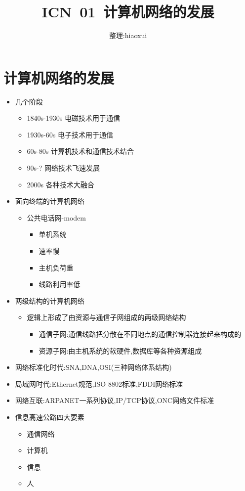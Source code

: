 \documentclass[a4paper,12pt,notitlepage]{article}
\begin{document}
\title{ICN\ 01\ 计算机网络的发展}
\author{整理:hiaoxui}
\maketitle

\section{计算机网络的发展} 

\begin{itemize}
	\item 几个阶段
	\begin{itemize}
		\item 1840s-1930s 电磁技术用于通信
		\item 1930s-60s 电子技术用于通信
		\item 60s-80s 计算机技术和通信技术结合
		\item 90s-? 网络技术飞速发展
		\item 2000s 各种技术大融合
	\end{itemize}
	\item 面向终端的计算机网络
	\begin{itemize}
		\item 公共电话网-modem
		\begin{itemize}
			\item 单机系统
			\item 速率慢
			\item 主机负荷重
			\item 线路利用率低
		\end{itemize}
	\end{itemize}
	\item 两级结构的计算机网络
	\begin{itemize}
		\item 逻辑上形成了由资源与通信子网组成的两级网络结构
		\begin{itemize}
			\item 通信子网:通信线路把分散在不同地点的通信控制器连接起来构成的
			\item 资源子网:由主机系统的软硬件,数据库等各种资源组成
		\end{itemize}
	\end{itemize}
	\item 网络标准化时代:SNA,DNA,OSI(三种网络体系结构)
	\item 局域网时代:Ethernet规范,ISO 8802标准,FDDI网络标准
	\item 网络互联:ARPANET一系列协议,IP/TCP协议,ONC网络文件标准
	\item 信息高速公路四大要素
	\begin{itemize}
		\item 通信网络
		\item 计算机
		\item 信息
		\item 人
	\end{itemize}
\end{itemize}
\end{document}
